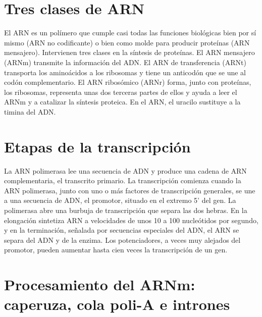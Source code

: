 \documentclass{book}
\begin{document}

\section{Tres clases de ARN}

El ARN es un polímero que cumple casi todas las funciones biológicas bien por sí mismo (ARN no codificante) o bien como molde para producir proteínas (ARN mensajero). Intervienen tres clases en la síntesis de proteínas. El ARN mensajero (ARNm) transmite la información del ADN. El ARN de transferencia (ARNt) transporta los aminoácidos a los ribosomas y tiene un anticodón que se une al codón complementario. El ARN ribosómico (ARNr) forma, junto con proteínas, los ribosomas, representa unas dos terceras partes de ellos y ayuda a leer el ARNm y a catalizar la síntesis proteica. En el ARN, el uracilo sustituye a la timina del ADN.


\section{Etapas de la transcripción}

La ARN polimerasa lee una secuencia de ADN y produce una cadena de ARN complementaria, el transcrito primario. La transcripción comienza cuando la ARN polimerasa, junto con uno o más factores de transcripción generales, se une a una secuencia de ADN, el promotor, situado en el extremo 5' del gen. La polimerasa abre una burbuja de transcripción que separa las dos hebras. En la elongación sintetiza ARN a velocidades de unos 10 a 100 nucleótidos por segundo, y en la terminación, señalada por secuencias especiales del ADN, el ARN se separa del ADN y de la enzima. Los potenciadores, a veces muy alejados del promotor, pueden aumentar hasta cien veces la transcripción de un gen.


\section{Procesamiento del ARNm: caperuza, cola poli-A e intrones}
\end{document}
